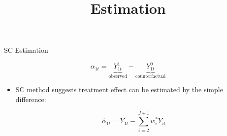 \documentclass[hyperref={pdfpagelabels=false}]{beamer}
\begin{document}
\title[]  
{Estimation}


\author 
{}

\institute{}






\date
{}


\begin{frame}{}
\titlepage
\end{frame}




\begin{frame}{SC Estimation}




\begin{equation*}
\alpha_{1t}=\underbrace{Y^1_{1t}}_{\text{observed}}-\underbrace{Y^0_{1t}}_{\text{counterfactual}}
\end{equation*}	
\begin{itemize}
\item SC method suggests treatment effect can be estimated by the simple difference:

\begin{equation*}
\hat{\alpha}_{1t}=Y_{1t}-\sum^{J+1}_{i=2}w^*_{i}Y_{it}
\end{equation*}
	

\end{itemize}
\end{frame}
\end{document}
